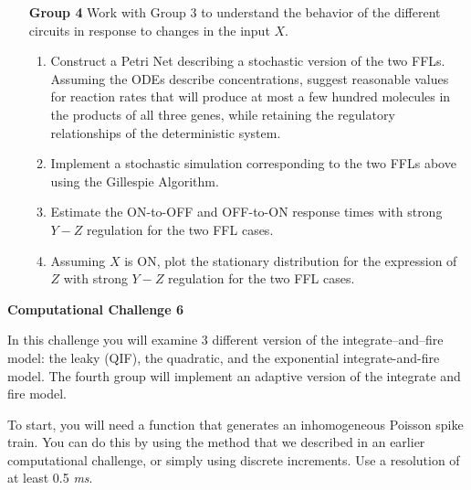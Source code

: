 \documentclass[12pt]{article}
\begin{document}
\begin{enumerate}
\item[\bf Group 4] Work with Group 3 to understand the behavior of the different circuits in response to changes in the input $X$.

\begin{enumerate}
\item Construct a Petri Net describing a stochastic version of the two FFLs. Assuming the ODEs describe concentrations, suggest reasonable values for reaction rates that will produce at most a few hundred molecules in the products of all three genes, while retaining the regulatory relationships of the deterministic system.
\item Implement a stochastic simulation corresponding to the two FFLs above using the Gillespie Algorithm. 
\item Estimate the ON-to-OFF and OFF-to-ON response times with strong $Y-Z$ regulation for the two FFL cases.
\item Assuming $X$ is ON, plot the stationary distribution for the expression of $Z$ with strong $Y-Z$ regulation for the two FFL cases.

\end{enumerate}

\end{enumerate}


\clearpage


\begin{center}
{\Large \bf Computational Challenge 6
\\ \vskip5mm }
\end{center}



In this challenge you will examine 3 different version of the integrate--and--fire model: the leaky (QIF), the quadratic,
and the exponential integrate-and-fire model. The fourth group will implement an adaptive version of the integrate and fire model.

To start, you will need a function that generates an inhomogeneous Poisson spike train. You can do this by using
the method that we described in an earlier computational challenge, or simply using discrete increments.  Use a resolution
of at least 0.5 \emph{ms}.   
\end{document}
